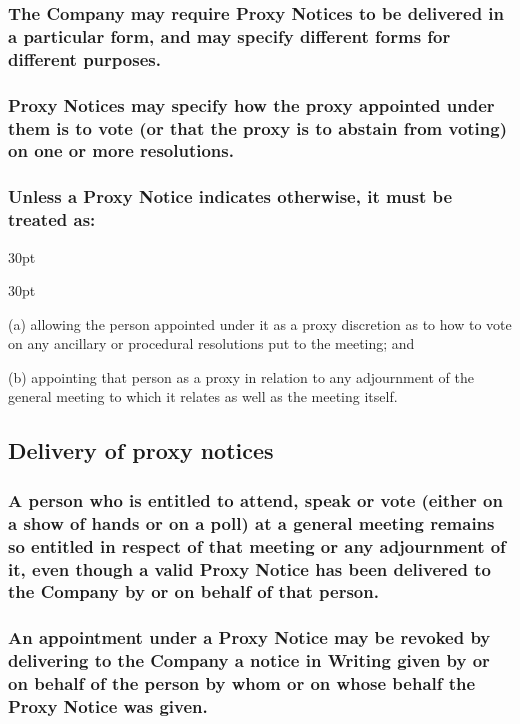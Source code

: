 \documentclass[12pt]{article}
\def\clauseindent{30pt}
\newenvironment{subindentlist}{\raggedright\begin{adjustwidth}{\clauseindent}{}\begin{labeledlist}{\clauseindent}}{\end{labeledlist}\end{adjustwidth}}
\begin{document}
\subsubsection[Form of proxy notices]{The Company may require Proxy Notices to be delivered in a particular form, and may specify different forms for different purposes.}
\subsubsection[Directions contained in proxy notices]{Proxy Notices may specify how the proxy appointed under them is to vote (or that the proxy is to abstain from voting) on one or more resolutions.}
\subsubsection[Implication of proxy notices]{Unless a Proxy Notice indicates otherwise, it must be treated as:}
\begin{subindentlist}
    \item [(a)] allowing the person appointed under it as a proxy discretion as to how to vote on any ancillary or procedural resolutions put to the meeting; and
    \item [(b)] appointing that person as a proxy in relation to any adjournment of the general meeting to which it relates as well as the meeting itself.
\end{subindentlist}

\subsection{Delivery of proxy notices}
\subsubsection[Rights of Members represented by proxy]{A person who is entitled to attend, speak or vote (either on a show of hands or on a poll) at a general meeting remains so entitled in respect of that meeting or any adjournment of it, even though a valid Proxy Notice has been delivered to the Company by or on behalf of that person.}
\subsubsection[Revocation of proxy notices]{An appointment under a Proxy Notice may be revoked by delivering to the Company a notice in Writing given by or on behalf of the person by whom or on whose behalf the Proxy Notice was given.}
\end{document}
